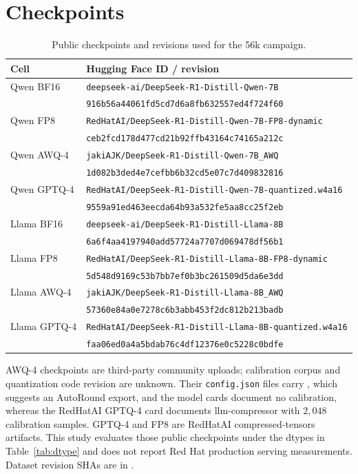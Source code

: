 \documentclass[11pt,a4paper]{article}
\begin{document}
\section{Checkpoints}
\begin{table}[t]
\centering
\caption{Public checkpoints and revisions used for the 56k campaign.}
\label{tab:checkpoints}
{\footnotesize
\begin{tabular}{lp{}}
\toprule
\textbf{Cell} & \textbf{Hugging Face ID / revision} \\
\midrule
Qwen BF16 & \texttt{deepseek-ai/DeepSeek-R1-Distill-Qwen-7B}\\
 & \texttt{916b56a44061fd5cd7d6a8fb632557ed4f724f60} \\
Qwen FP8 & \texttt{RedHatAI/DeepSeek-R1-Distill-Qwen-7B-FP8-dynamic}\\
 & \texttt{ceb2fcd178d477cd21b92ffb43164c74165a212c} \\
Qwen AWQ-4 & \texttt{jakiAJK/DeepSeek-R1-Distill-Qwen-7B\_AWQ}\\
 & \texttt{1d082b3ded4e7cefbb6b32cd5e07c7d409832816} \\
Qwen GPTQ-4 & \texttt{RedHatAI/DeepSeek-R1-Distill-Qwen-7B-quantized.w4a16}\\
 & \texttt{9559a91ed463eecda64b93a532fe5aa8cc25f2eb} \\
Llama BF16 & \texttt{deepseek-ai/DeepSeek-R1-Distill-Llama-8B}\\
 & \texttt{6a6f4aa4197940add57724a7707d069478df56b1} \\
Llama FP8 & \texttt{RedHatAI/DeepSeek-R1-Distill-Llama-8B-FP8-dynamic}\\
 & \texttt{5d548d9169c53b7bb7ef0b3bc261509d5da6e3dd} \\
Llama AWQ-4 & \texttt{jakiAJK/DeepSeek-R1-Distill-Llama-8B\_AWQ}\\
 & \texttt{57360e84a0e7278c6b3abb453f2dc812b213badb} \\
Llama GPTQ-4 & \texttt{RedHatAI/DeepSeek-R1-Distill-Llama-8B-quantized.w4a16}\\
 & \texttt{faa06ed0a4a5bdab76c4df12376e0c5228c0bdfe} \\
\bottomrule
\end{tabular}
}
\end{table}

AWQ-4 checkpoints are third-party community uploads; calibration corpus and quantization code revision are unknown. Their \texttt{config.json} files carry  , which suggests an AutoRound export, and the model cards document no calibration, whereas the RedHatAI GPTQ-4 card documents llm-compressor with $2{,}048$ calibration samples. GPTQ-4 and FP8 are RedHatAI compressed-tensors artifacts. This study evaluates those public checkpoints under the dtypes in Table~\ref{tab:dtype} and does not report Red Hat production serving measurements. Dataset revision SHAs are in .
\end{document}
